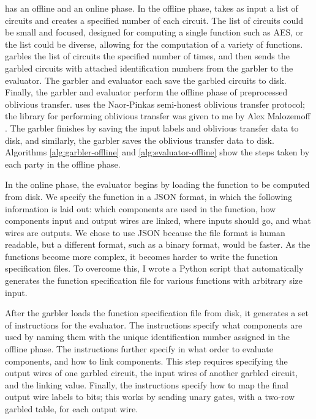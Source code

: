 \CompGC has an offline and an online phase. 
In the offline phase, \CompGC takes as input a list of circuits and creates a specified number of each circuit. 
The list of circuits could be small and focused, designed for computing a single function such as AES, or the list could be diverse, allowing for the computation of a variety of functions. 
\CompGC garbles the list of circuits the specified number of times, and then sends the garbled circuits with attached identification numbers from the garbler to the evaluator. 
The garbler and evaluator each save the garbled circuits to disk. 
Finally, the garbler and evaluator perform the offline phase of preprocessed oblivious transfer. 
\CompGC uses the Naor-Pinkas semi-honest oblivious transfer protocol; the library for performing oblivious transfer was given to me by Alex Malozemoff \cite{naor-pinkas-ot}. 
The garbler finishes by saving the input labels and oblivious transfer data to disk, and similarly, the garbler saves the oblivious transfer data to disk. 
Algorithms \ref{alg:garbler-offline} and \ref{alg:evaluator-offline} show the steps taken by each party in the offline phase. 

In the online phase, the evaluator begins by loading the function to be computed from disk. 
We specify the function in a JSON format, in which the following information is laid out: which components are used in the function, how components input and output wires are linked, where inputs should go, and what wires are outputs. 
We chose to use JSON because the file format is human readable, but a different format, such as a binary format, would be faster. 
As the functions become more complex, it becomes harder to write the function specification files. 
To overcome this, I wrote a Python script that automatically generates the function specification file for various functions with arbitrary size input. 

After the garbler loads the function specification file from disk, it generates a set of instructions for the evaluator. 
The instructions specify what components are used by naming them with the unique identification number assigned in the offline phase. 
The instructions further specify in what order to evaluate components, and how to link components. 
This step requires specifying the output wires of one garbled circuit, the input wires of another garbled circuit, and the linking value.
Finally, the instructions specify how to map the final output wire labels to bits; this works by sending unary gates, with a two-row garbled table, for each output wire. 

